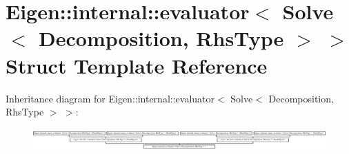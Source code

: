 \hypertarget{struct_eigen_1_1internal_1_1evaluator_3_01_solve_3_01_decomposition_00_01_rhs_type_01_4_01_4}{}\section{Eigen\+:\+:internal\+:\+:evaluator$<$ Solve$<$ Decomposition, Rhs\+Type $>$ $>$ Struct Template Reference}
\label{struct_eigen_1_1internal_1_1evaluator_3_01_solve_3_01_decomposition_00_01_rhs_type_01_4_01_4}
Inheritance diagram for Eigen\+:\+:internal\+:\+:evaluator$<$ Solve$<$ Decomposition, Rhs\+Type $>$ $>$\+:\begin{figure}[H]
\begin{center}
\leavevmode
\includegraphics[height=0.857143cm]{struct_eigen_1_1internal_1_1evaluator_3_01_solve_3_01_decomposition_00_01_rhs_type_01_4_01_4}
\end{center}
\end{figure}
